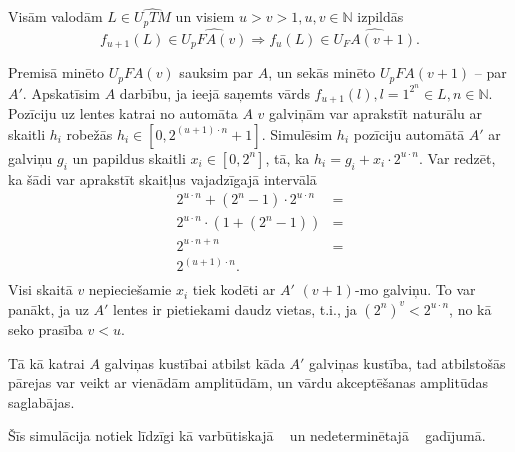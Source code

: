 \documentclass{ludis}
\begin{document}
\begin{lemma} \label{plus1}
Visām valodām $L \in \widehat{U_pTM}$ un visiem $u > v > 1, u, v \in \mathbb{N}$ izpildās
\[
	f_{u+1}(L) \in \widehat{U_pFA(v)} \Rightarrow f_u(L) \in \widehat{U_FA(v + 1)}.
\]
\end{lemma}
\begin{pieradijums}
Premisā minēto $U_pFA(v)$ sauksim par $A$, un sekās minēto $U_pFA(v + 1)$ -- par $A'$.
Apskatīsim $A$ darbību, ja ieejā saņemts vārds $f_{u+1}(l), l = 1^{2^n} \in L, n \in \mathbb{N}$. Pozīciju uz lentes katrai no automāta $A$ $v$ galviņām var aprakstīt naturālu ar skaitli $h_i$ robežās $h_i \in \left[0, 2^{(u + 1) \cdot n} + 1 \right]$. Simulēsim $h_i$ pozīciju automātā $A'$ ar galviņu $g_i$ un papildus skaitli $x_i \in \left[ 0, 2^n \right]$, tā, ka $h_i = g_i + x_i \cdot 2^{u \cdot n}$. Var redzēt, ka šādi var aprakstīt skaitļus vajadzīgajā intervālā
\begin{align*}
	2^{u \cdot n} + (2^n - 1) \cdot 2^{u \cdot n} & =\\
	2^{u \cdot n} \cdot (1 + (2^n - 1)) & =\\
	2^{u \cdot n + n} & =\\
	2^{(u + 1) \cdot n}.\\
\end{align*}
Visi skaitā $v$ nepieciešamie $x_i$ tiek kodēti ar $A'$ $(v+1)$-mo galviņu. %
To var panākt, ja uz $A'$ lentes ir pietiekami daudz vietas, t.i., ja $(2^n)^v < 2^{u \cdot n}$, no kā seko prasība $v < u$.

Tā kā katrai $A$ galviņas kustībai atbilst kāda $A'$ galviņas kustība, tad atbilstošās pārejas var veikt ar vienādām amplitūdām, un vārdu akceptēšanas amplitūdas saglabājas.

Šīs simulācija notiek līdzīgi kā varbūtiskajā ~\citep{Macarie1995} un nedeterminētajā ~\citep{Monien1980} gadījumā.
\end{pieradijums}
\end{document}

